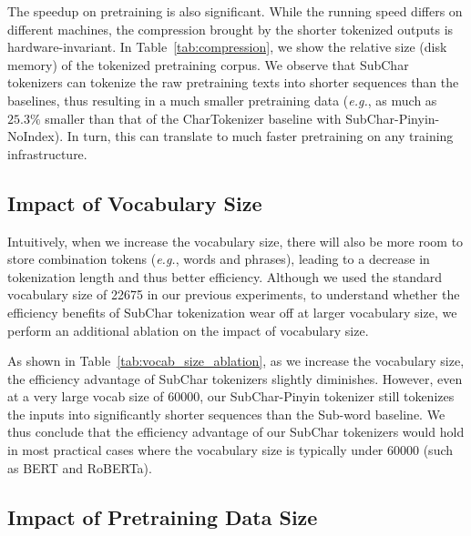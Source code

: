 The speedup on pretraining is also significant. While the running speed differs on different machines, the compression brought by the shorter tokenized outputs is hardware-invariant. In Table~\ref{tab:compression}, we show the relative size (disk memory) of the tokenized pretraining corpus. We observe that SubChar tokenizers can tokenize the raw pretraining texts into shorter sequences than the baselines, thus resulting in a much smaller pretraining data (\textit{e.g.}, as much as $25.3\%$ smaller than that of the CharTokenizer baseline with SubChar-Pinyin-NoIndex). In turn, this can translate to much faster pretraining on any training infrastructure.











\subsection{Impact of Vocabulary Size}

Intuitively, when we increase the vocabulary size, there will also be more room to store combination tokens (\textit{e.g.}, words and phrases), leading to a decrease in tokenization length and thus better efficiency. Although we used the standard vocabulary size of 22675 in our previous experiments, to understand whether the efficiency benefits of SubChar tokenization wear off at larger vocabulary size, we perform an additional ablation on the impact of vocabulary size. 

As shown in Table~\ref{tab:vocab_size_ablation}, as we increase the vocabulary size, the efficiency advantage of SubChar tokenizers slightly diminishes. However, even at a very large vocab size of 60000, our SubChar-Pinyin tokenizer still tokenizes the inputs into significantly shorter sequences than the Sub-word baseline.  We thus conclude that the efficiency advantage of our SubChar tokenizers would hold in most practical cases where the vocabulary size is typically under 60000 (such as BERT and RoBERTa). 



\subsection{Impact of Pretraining Data Size}
\label{sec:pretraining-data}

